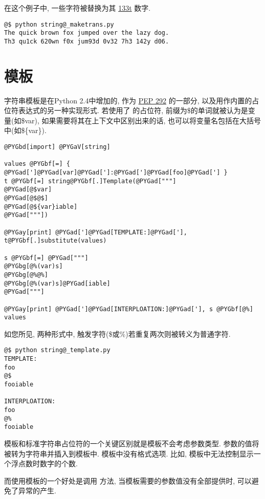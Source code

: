 \documentclass[a4paper,10pt,english]{manual}
\begin{document}
在这个例子中, 一些字符被替换为其 \href{http://en.wikipedia.org/wiki/Leet}{133t} 数字.

\begin{Verbatim}[commandchars=@\[\]]
@$ python string@_maketrans.py
The quick brown fox jumped over the lazy dog.
Th3 qu1ck 620wn f0x jum93d 0v32 7h3 142y d06.
\end{Verbatim}


\section{模板}

字符串模板是在Python 2.4中增加的, 作为 \href{http://www.python.org/peps/pep-0292.html}{PEP 292} 的一部分, 以及用作内置的占位符表达式的另一种实现形式. 若使用了  的占位符, 前缀为\$的单词就被认为是变量(如\$var), 如果需要将其在上下文中区别出来的话, 也可以将变量名包括在大括号中(如\$\{var\}).

\begin{Verbatim}[commandchars=@\[\]]
@PYGbd[import] @PYGaV[string]

values @PYGbf[=] { @PYGad[']@PYGad[var]@PYGad[']:@PYGad[']@PYGad[foo]@PYGad['] }
t @PYGbf[=] string@PYGbf[.]Template(@PYGad["""]
@PYGad[@$var]
@PYGad[@$@$]
@PYGad[@${var}iable]
@PYGad["""])

@PYGay[print] @PYGad[']@PYGad[TEMPLATE:]@PYGad['], t@PYGbf[.]substitute(values)

s @PYGbf[=] @PYGad["""]
@PYGbg[@%(var)s]
@PYGbg[@%@%]
@PYGbg[@%(var)s]@PYGad[iable]
@PYGad["""]

@PYGay[print] @PYGad[']@PYGad[INTERPLOATION:]@PYGad['], s @PYGbf[@%] values
\end{Verbatim}

如您所见, 两种形式中, 触发字符(\$或\%)若重复两次则被转义为普通字符.

\begin{Verbatim}[commandchars=@\[\]]
@$ python string@_template.py
TEMPLATE:
foo
@$
fooiable

INTERPLOATION:
foo
@%
fooiable
\end{Verbatim}

模板和标准字符串占位符的一个关键区别就是模板不会考虑参数类型. 参数的值将被转为字符串并插入到模板中. 模板中没有格式选项. 比如, 模板中无法控制显示一个浮点数时数字的个数.

而使用模板的一个好处是调用  方法, 当模板需要的参数值没有全部提供时, 可以避免了异常的产生.
\end{document}
